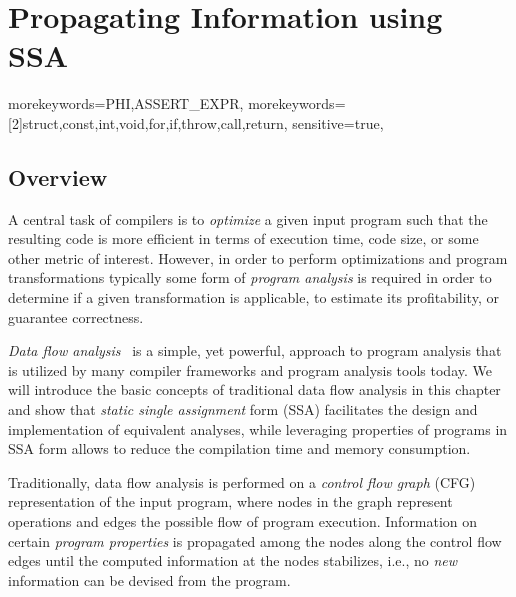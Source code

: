 \providecommand\lcode{\begingroup \small\urlstyle{tt}\Url}
\providecommand\lident{\begingroup \small\urlstyle{tt}\Url}

\chapter{Propagating Information using SSA}

\newcommand{\obacht}[2]{\marginpar{\tiny\textbf{#1:} #2}}

\graphicspath{{img/}{constant_propagation_is_easier/img/}{part3/constant_propagation_is_easier/img/}}

{
  morekeywords={PHI,ASSERT_EXPR},
  morekeywords=[2]{struct,const,int,void,for,if,throw,call,return},
  sensitive=true,
}

\lstset{
  mathescape=true,
  language=DNlisting,
  basicstyle=\small,
  keywordstyle=\ttfamily,
  keywordstyle=[2]\bfseries,
  numbers=left
}

\section{Overview}

A central task of compilers is to \emph{optimize} a given input program such
that the resulting code is more efficient in terms of execution time, code size,
or some other metric of interest. However, in order to perform optimizations and
program transformations typically some form of \emph{program analysis} is
required in order to determine if a given transformation is applicable, to
estimate its profitability, or guarantee correctness.

\emph{Data flow analysis}~\cite{novillo:bib:NNH99} is a simple, yet powerful,
approach to program analysis that is utilized by many compiler frameworks and
program analysis tools today. We will introduce the basic concepts of
traditional data flow analysis in this chapter and show that \emph{static single
assignment} form (SSA) facilitates the design and implementation of equivalent
analyses, while leveraging properties of programs in SSA form allows to reduce
the compilation time and memory consumption.

Traditionally, data flow analysis is performed on a \emph{control flow graph}
(CFG) representation of the input program, where nodes in the graph represent
operations and edges the possible flow of program execution.
Information on certain \emph{program properties} is propagated among
the nodes along the control flow edges until the computed information at the
nodes stabilizes, i.e., no \emph{new} information can be devised from the
program.

